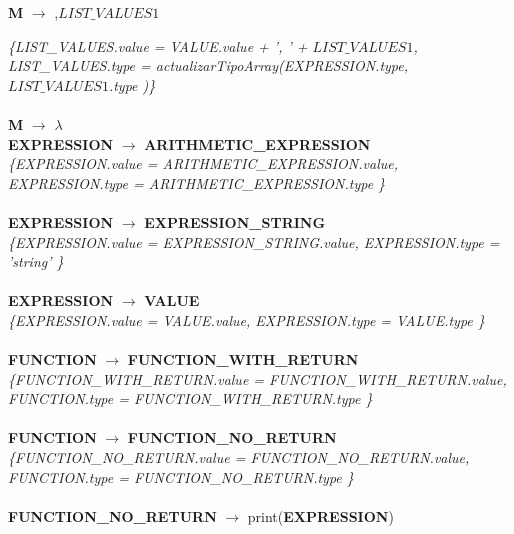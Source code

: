 \documentclass[10pt,a4paper]{article}
\begin{document}
\textbf{M} $\rightarrow$ ,\textbf{$LIST\_VALUES{1}$}

\textit{\{LIST\_VALUES.value =  VALUE.value + ', ' + $LIST\_VALUES{1}$, LIST\_VALUES.type = actualizarTipoArray(EXPRESSION.type, $LIST\_VALUES{1}$.type )\}}  \\ \\

\textbf{M} $\rightarrow$ $\lambda$ \\

\textbf{EXPRESSION} $\rightarrow$ \textbf{ARITHMETIC\_EXPRESSION} \\   

\textit{\{EXPRESSION.value =  ARITHMETIC\_EXPRESSION.value, EXPRESSION.type = ARITHMETIC\_EXPRESSION.type \}}  \\ \\


\textbf{EXPRESSION} $\rightarrow$ \textbf{EXPRESSION\_STRING} \\

\textit{\{EXPRESSION.value =  EXPRESSION\_STRING.value, EXPRESSION.type = 'string' \}}  \\ \\


\textbf{EXPRESSION} $\rightarrow$ \textbf{VALUE} \\

\textit{\{EXPRESSION.value =  VALUE.value, EXPRESSION.type = VALUE.type \}}  \\ \\



\textbf{FUNCTION} $\rightarrow$ \textbf{FUNCTION\_WITH\_RETURN} \\

\textit{\{FUNCTION\_WITH\_RETURN.value =  FUNCTION\_WITH\_RETURN.value, FUNCTION.type = FUNCTION\_WITH\_RETURN.type \}}  \\ \\


\textbf{FUNCTION} $\rightarrow$ \textbf{FUNCTION\_NO\_RETURN} \\

\textit{\{FUNCTION\_NO\_RETURN.value =  FUNCTION\_NO\_RETURN.value, FUNCTION.type = FUNCTION\_NO\_RETURN.type \}}  \\ \\



\textbf{FUNCTION\_NO\_RETURN} $\rightarrow$ print(\textbf{EXPRESSION}) \\   
\end{document}
